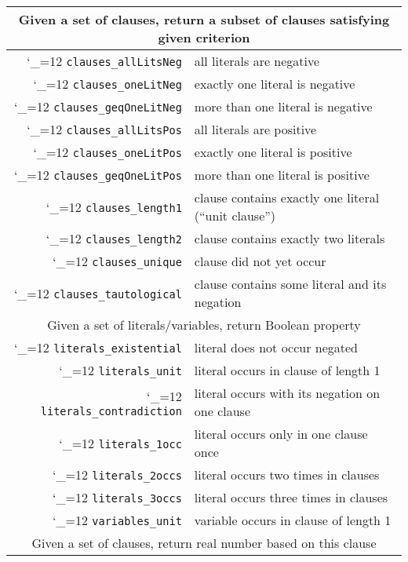 \newcommand{\satf}{\begingroup \catcode`_=12 \dosatf}
\newcommand{\dosatf}[1]{\texttt{#1}\endgroup}
\newcommand\sath[1]{\hline \multicolumn{2}{|c|}{#1} \\ \hline}
\begin{table}[!ht]
  \begin{tabular}{rl}
    \sath{Given a set of clauses, return a subset of clauses satisfying given criterion}
    \satf{clauses_allLitsNeg}     & all literals are negative \\
    \satf{clauses_oneLitNeg}      & exactly one literal is negative \\
    \satf{clauses_geqOneLitNeg}   & more than one literal is negative \\
    \satf{clauses_allLitsPos}     & all literals are positive \\
    \satf{clauses_oneLitPos}      & exactly one literal is positive \\
    \satf{clauses_geqOneLitPos}   & more than one literal is positive \\
    \satf{clauses_length1}        & clause contains exactly one literal (\enquote{unit clause}) \\
    \satf{clauses_length2}        & clause contains exactly two literals \\
    \satf{clauses_unique}         & clause did not yet occur \\
    \satf{clauses_tautological}   & clause contains some literal and its negation \\
    \sath{Given a set of literals/variables, return Boolean property}
    \satf{literals_existential}   & literal does not occur negated \\
    \satf{literals_unit}          & literal occurs in clause of length 1 \\
    \satf{literals_contradiction} & literal occurs with its negation on one clause \\
    \satf{literals_1occ}          & literal occurs only in one clause once \\
    \satf{literals_2occs}         & literal occurs two times in clauses \\
    \satf{literals_3occs}         & literal occurs three times in clauses \\
    \satf{variables_unit}         & variable occurs in clause of length 1 \\
    \sath{Given a set of clauses, return real number based on this clause}

\end{tabular}
\end{table}
